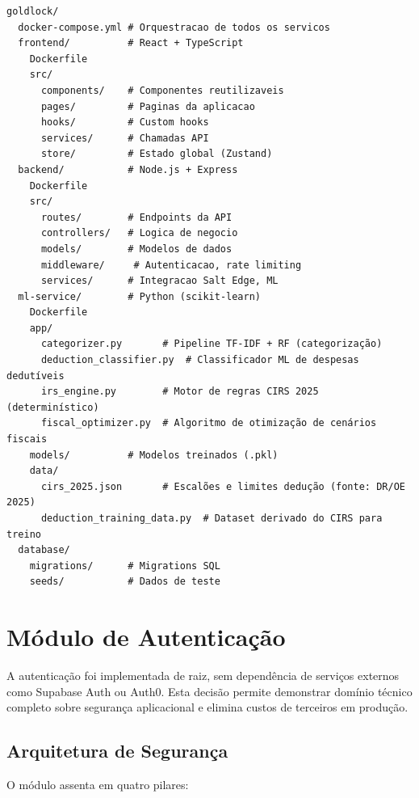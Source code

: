 \begin{lstlisting}[caption={Estrutura de diretórios do projeto.},label={lst:structure}]
goldlock/
  docker-compose.yml # Orquestracao de todos os servicos
  frontend/          # React + TypeScript
    Dockerfile
    src/
      components/    # Componentes reutilizaveis
      pages/         # Paginas da aplicacao
      hooks/         # Custom hooks
      services/      # Chamadas API
      store/         # Estado global (Zustand)
  backend/           # Node.js + Express
    Dockerfile
    src/
      routes/        # Endpoints da API
      controllers/   # Logica de negocio
      models/        # Modelos de dados
      middleware/     # Autenticacao, rate limiting
      services/      # Integracao Salt Edge, ML
  ml-service/        # Python (scikit-learn)
    Dockerfile
    app/
      categorizer.py       # Pipeline TF-IDF + RF (categorização)
      deduction_classifier.py  # Classificador ML de despesas dedutíveis
      irs_engine.py        # Motor de regras CIRS 2025 (determinístico)
      fiscal_optimizer.py  # Algoritmo de otimização de cenários fiscais
    models/          # Modelos treinados (.pkl)
    data/
      cirs_2025.json       # Escalões e limites dedução (fonte: DR/OE 2025)
      deduction_training_data.py  # Dataset derivado do CIRS para treino
  database/
    migrations/      # Migrations SQL
    seeds/           # Dados de teste
\end{lstlisting}


\section{Módulo de Autenticação}
\label{sec:impl-auth}

A autenticação foi implementada de raiz, sem dependência de serviços externos como Supabase Auth ou Auth0. Esta decisão permite demonstrar domínio técnico completo sobre segurança aplicacional e elimina custos de terceiros em produção.

\subsection{Arquitetura de Segurança}

O módulo assenta em quatro pilares:

